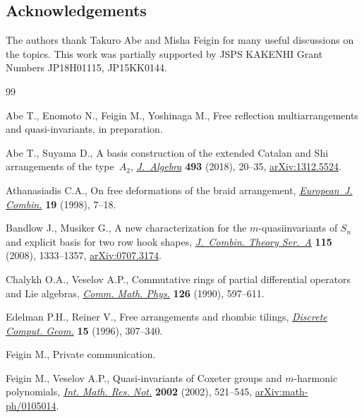 \documentclass[pdftex]{sigma}
\numberwithin{equation}{section}
\begin{document}
\subsection*{Acknowledgements}

The authors thank Takuro Abe and Misha Feigin for many useful discussions on the topics.
This work was partially supported by JSPS KAKENHI Grant Numbers JP18H01115, JP15KK0144.

\begin{thebibliography}{99}
\footnotesize\itemsep=0pt

Abe T., Enomoto N., Feigin M., Yoshinaga M., Free reflection multiarrangements
 and quasi-invariants, {i}n preparation.

Abe T., Suyama D., A basis construction of the extended {C}atalan and {S}hi
 arrangements of the type~{$A_2$}, \href{https://doi.org/10.1016/j.jalgebra.2017.09.024}{\textit{J.~Algebra}} \textbf{493} (2018),
 20--35, \href{https://arxiv.org/abs/1312.5524}{arXiv:1312.5524}.

Athanasiadis C.A., On free deformations of the braid arrangement,
 \href{https://doi.org/10.1006/eujc.1997.0149}{\textit{European~J. Combin.}} \textbf{19} (1998), 7--18.

Bandlow J., Musiker G., A new characterization for the {$m$}-quasiinvariants of
 {$S_n$} and explicit basis for two row hook shapes, \href{https://doi.org/10.1016/j.jcta.2008.01.011}{\textit{J.~Combin. Theory
 Ser.~A}} \textbf{115} (2008), 1333--1357, \href{https://arxiv.org/abs/0707.3174}{arXiv:0707.3174}.

Chalykh O.A., Veselov A.P., Commutative rings of partial differential operators
 and {L}ie algebras, \href{https://doi.org/10.1007/BF02125702}{\textit{Comm. Math. Phys.}} \textbf{126} (1990), 597--611.

Edelman P.H., Reiner V., Free arrangements and rhombic tilings,
 \href{https://doi.org/10.1007/BF02711498}{\textit{Discrete Comput. Geom.}} \textbf{15} (1996), 307--340.

Feigin M., Private communication.

Feigin M., Veselov A.P., Quasi-invariants of {C}oxeter groups and
 {$m$}-harmonic polynomials, \href{https://doi.org/10.1155/S1073792802106064}{\textit{Int. Math. Res. Not.}} \textbf{2002}
 (2002), 521--545, \href{https://arxiv.org/abs/math-ph/0105014}{arXiv:math-ph/0105014}.


\end{thebibliography}
\end{document}
